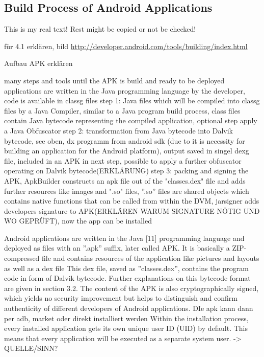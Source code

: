 \subsection{Build Process of Android Applications} \label{subsection:foundation-android-build}
This is my real text! Rest might be copied or not be checked!


für 4.1 erklären, bild
\url{http://developer.android.com/tools/building/index.html}\newline

Aufbau APK erklären\newline

many steps and tools until the APK is build and ready to be deployed\newline
applications are written in the Java programming language by the developer, code is available in \gls{classg} files\newline
step 1:  Java files which will be compiled into \gls{classg} files by a Java Compiler,  similar to a Java program build process, class files contain Java bytecode representing the compiled application, optional step apply a Java Obfuscator\newline
step 2: transformation from Java bytecode into Dalvik bytecode, see oben, dx programm from android sdk (due to it is necessity for building an application for the Android platform), output saved in singel \gls{dexg} file, included in an APK in next step, possible to apply a further obfuscator operating
on Dalvik bytecode(ERKLÄRUNG)\newline
step 3: packing and signing the APK, ApkBuilder constructs an apk file out of the "classes.dex" file and adds further resources like images and ".so" files, ”.so” files are shared objects which contains native functions that can be called from within the DVM, jarsigner adds developers signature to APK(ERKLÄREN WARUM SIGNATURE NÖTIG UND WO GEPRÜFT), now the app can be installed



Android applications are written in the Java [11] programming language and deployed as files with an ”.apk” suffix, later called APK. It is basically a ZIP-compressed file and contains resources of the application like pictures and layouts as well as a dex file\newline
This dex file, saved as ”classes.dex”, contains the program code in form of Dalvik bytecode. Further explanations on this bytecode format are given in section 3.2. The content of the APK is also cryptographically signed, which yields no security improvement but helps to distinguish and confirm authenticity of different developers of Android applications.\newline
DIe apk kann dann per adb, market oder direkt installiert werden\newline
Within the installation process, every installed application gets its own unique user ID (UID) by default. This means that every application will be executed as a separate system user. -> QUELLE/SINN?\newline

